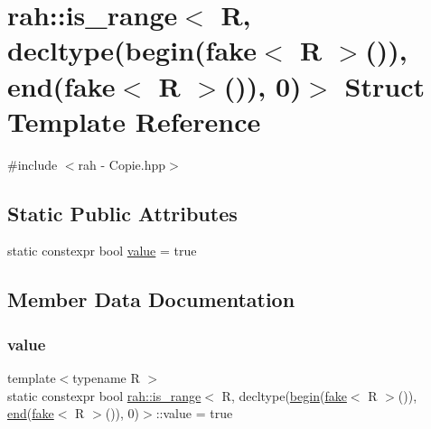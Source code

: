 \hypertarget{structrah_1_1is__range_3_01_r_00_01decltype_07begin_07fake_3_01_r_01_4_07_08_08_00_01end_07fake_cf1a9a1e2579209cb82001bc9eda23c1}{}\section{rah\+::is\+\_\+range$<$ R, decltype(begin(fake$<$ R $>$()), end(fake$<$ R $>$()), 0)$>$ Struct Template Reference}
\label{structrah_1_1is__range_3_01_r_00_01decltype_07begin_07fake_3_01_r_01_4_07_08_08_00_01end_07fake_cf1a9a1e2579209cb82001bc9eda23c1}


{\ttfamily \#include $<$rah -\/ Copie.\+hpp$>$}

\subsection*{Static Public Attributes}
\begin{DoxyCompactItemize}
\item 
static constexpr bool \mbox{\hyperlink{structrah_1_1is__range_3_01_r_00_01decltype_07begin_07fake_3_01_r_01_4_07_08_08_00_01end_07fake_cf1a9a1e2579209cb82001bc9eda23c1_aea9f956293b799924d96ab46f06f9569}{value}} = true
\end{DoxyCompactItemize}


\subsection{Member Data Documentation}
\mbox{\label{structrah_1_1is__range_3_01_r_00_01decltype_07begin_07fake_3_01_r_01_4_07_08_08_00_01end_07fake_cf1a9a1e2579209cb82001bc9eda23c1_aea9f956293b799924d96ab46f06f9569}} 
\subsubsection{\texorpdfstring{value}{value}}
{\footnotesize\ttfamily template$<$typename R $>$ \\
static constexpr bool \mbox{\hyperlink{structrah_1_1is__range}{rah\+::is\+\_\+range}}$<$ R, decltype(\mbox{\hyperlink{namespacerah_acccec48f25fb1a805854818f05d7b616}{begin}}(\mbox{\hyperlink{namespacerah_aa659f5ae02cb923cd8813f96cfd86a25}{fake}}$<$ R $>$()), \mbox{\hyperlink{namespacerah_a20a3e45aee90bb5534a00c6b14e06069}{end}}(\mbox{\hyperlink{namespacerah_aa659f5ae02cb923cd8813f96cfd86a25}{fake}}$<$ R $>$()), 0)$>$\+::value = true\hspace{0.3cm}{\ttfamily [static]}}




